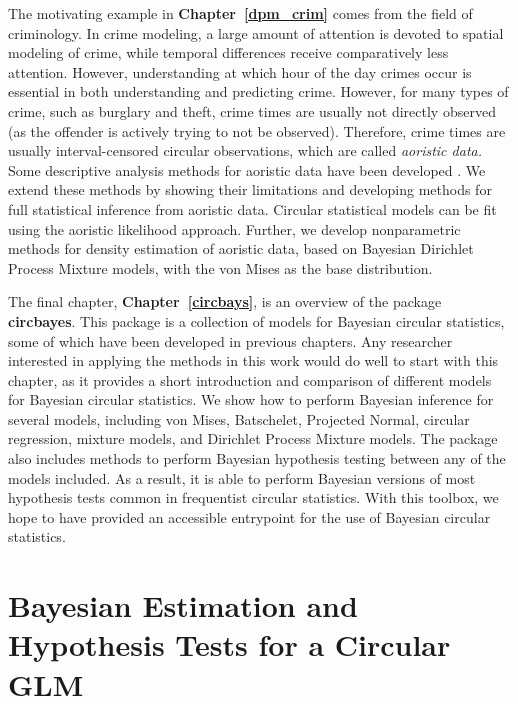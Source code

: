 \documentclass[12pt, a4paper]{book}\usepackage[]{graphicx}\usepackage{xcolor}
\let\proglang=\textsf
\newcommand{\pkg}[1]{\textbf{#1}}
\begin{document}
The motivating example in \textbf{Chapter~\ref{dpm_crim}} comes from the field of criminology. In crime modeling, a large amount of attention is devoted to spatial modeling of crime, while temporal differences receive comparatively less attention. However, understanding at which hour of the day crimes occur is essential in both understanding and predicting crime. However, for many types of crime, such as burglary and theft, crime times are usually not directly observed (as the offender is actively trying to not be observed). Therefore, crime times are usually interval-censored circular observations, which are called \textit{aoristic data.} Some descriptive analysis methods for aoristic data have been developed \citep{ashby2013comparison}. We extend these methods by showing their limitations and developing methods for full statistical inference from aoristic data. Circular statistical models can be fit using the aoristic likelihood approach. Further, we develop nonparametric methods for density estimation of aoristic data, based on Bayesian Dirichlet Process Mixture models, with the von Mises as the base distribution.

The final chapter, \textbf{Chapter~\ref{circbays}}, is an overview of the package \pkg{circbayes}. This package is a collection of  models for Bayesian circular statistics, some of which have been developed in previous chapters. Any researcher interested in applying the methods in this work would do well to start with this chapter, as it provides a short introduction and comparison of different models for Bayesian circular statistics. We show how to perform Bayesian inference for several models, including von Mises, Batschelet, Projected Normal, circular regression, mixture models, and Dirichlet Process Mixture models. The package also includes methods to perform Bayesian hypothesis testing between any of the models included.
As a result, it is able to perform Bayesian versions of most hypothesis tests common in frequentist circular statistics. With this toolbox, we hope to have provided an accessible entrypoint for the use of Bayesian circular statistics.




\mainmatter
\chapter{Bayesian Estimation and Hypothesis Tests for a Circular GLM}
\label{circglm}
\end{document}
